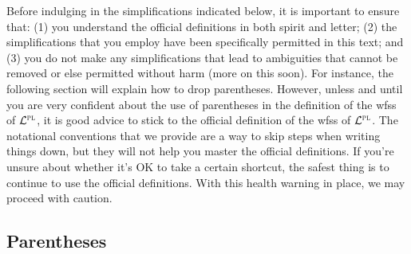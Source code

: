 Before indulging in the simplifications indicated below, it is important to ensure that: (1) you understand the official definitions in both spirit and letter; (2) the simplifications that you employ have been specifically permitted in this text; and (3) you do not make any simplifications that lead to ambiguities that cannot be removed or else permitted without harm (more on this soon).
For instance, the following section will explain how to drop parentheses. 
However, unless and until you are very confident about the use of parentheses in the definition of the wfss of $\mathcal{L}^{\textsc{pl}}$, it is good advice to stick to the official definition of the wfss of $\mathcal{L}^{\textsc{pl}}$.
The notational conventions that we provide are a way to skip steps when writing things down, but they will not help you master the official definitions.
If you're unsure about whether it's OK to take a certain shortcut, the safest thing is to continue to use the official definitions.
With this health warning in place, we may proceed with caution.






\subsection{Parentheses}
  \label{sub:parentheses}

